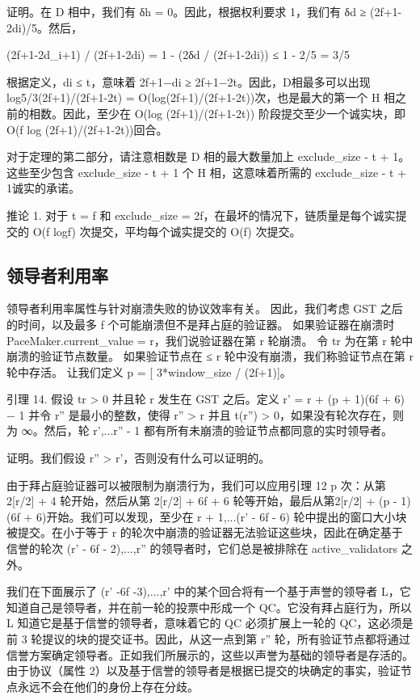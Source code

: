 证明。在 D 相中，我们有 δh = 0。因此，根据权利要求 1，我们有 δd ≥ (2f+1-2di)/5。然后，

(2f+1-2d\_i+1) / (2f+1-2di) = 1 - (2δd / (2f+1-2di)) ≤ 1 - 2/5 = 3/5

根据定义，di ≤ t，意味着 2f+1−di ≥ 2f+1−2t。因此，D相最多可以出现log5/3(2f+1)/(2f+1-2t) = O(log(2f+1)/(2f+1-2t))次，也是最大的第一个 H 相之前的相数。因此，至少在 O(log (2f+1)/(2f+1-2t)) 阶段提交至少一个诚实块，即 O(f log (2f+1)/(2f+1-2t))回合。

对于定理的第二部分，请注意相数是 D 相的最大数量加上 exclude\_size - t + 1。这些至少包含 exclude\_size - t + 1 个 H 相，这意味着所需的 exclude\_size - t + 1诚实的承诺。

推论 1. 对于 t = f 和 exclude\_size = 2f，在最坏的情况下，链质量是每个诚实提交的 O(f logf) 次提交，平均每个诚实提交的 O(f) 次提交。

\subsection{领导者利用率}

领导者利用率属性与针对崩溃失败的协议效率有关。 因此，我们考虑 GST 之后的时间，以及最多 f 个可能崩溃但不是拜占庭的验证器。 如果验证器在崩溃时 PaceMaker.current\_value = r，我们说验证器在第 r 轮崩溃。 令 tr 为在第 r 轮中崩溃的验证节点数量。
如果验证节点在 ≤ r 轮中没有崩溃，我们称验证节点在第 r 轮中存活。 让我们定义 p = [ 3*window\_size / (2f+1)]。

引理 14. 假设 tr > 0 并且轮 r 发生在 GST 之后。定义 r' = r + (p + 1)(6f + 6) − 1 并令 r'' 是最小的整数，使得 r'' > r 并且 t(r'') > 0，如果没有轮次存在，则为 ∞。然后，轮 r',...r'' - 1 都有所有未崩溃的验证节点都同意的实时领导者。

证明。我们假设 r'' > r'，否则没有什么可以证明的。

由于拜占庭验证器可以被限制为崩溃行为，我们可以应用引理 12 p 次：从第 2[r/2] + 4 轮开始，然后从第 2[r/2] + 6f + 6 轮等开始，最后从第2[r/2] + (p - 1)(6f + 6)开始。我们可以发现，至少在 r + 1,...(r' - 6f - 6) 轮中提出的窗口大小块被提交。在小于等于 r 的轮次中崩溃的验证器无法验证这些块，因此在确定基于信誉的轮次 (r' - 6f - 2),...,r'' 的领导者时，它们总是被排除在 active\_validators 之外。

我们在下面展示了 (r' -6f -3),...,r' 中的某个回合将有一个基于声誉的领导者 L，它知道自己是领导者，并在前一轮的投票中形成一个 QC。它没有拜占庭行为，所以 L 知道它是基于信誉的领导者，意味着它的 QC 必须扩展上一轮的 QC，这必须是前 3 轮提议的块的提交证书。因此，从这一点到第 r'' 轮，所有验证节点都将通过信誉方案确定领导者。正如我们所展示的，这些以声誉为基础的领导者是存活的。由于协议（属性 2）以及基于信誉的领导者是根据已提交的块确定的事实，验证节点永远不会在他们的身份上存在分歧。


